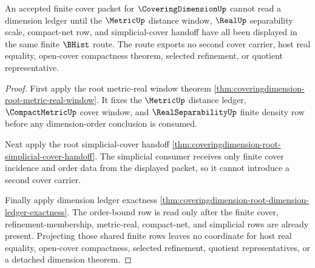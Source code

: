 \begin{theorem}
\label{thm:coveringdimension-root-metric-real-window-separation}
An accepted finite cover packet for $\CoveringDimensionUp$ cannot read a dimension ledger until the $\MetricUp$ distance window, $\RealUp$ separability scale, compact-net row, and simplicial-cover handoff have all been displayed in the same finite $\BHist$ route. The route exports no second cover carrier, host real equality, open-cover compactness theorem, selected refinement, or quotient representative.
\end{theorem}
\begin{proof}
First apply the root metric-real window theorem \autoref{thm:coveringdimension-root-metric-real-window}. It fixes the $\MetricUp$ distance ledger, $\CompactMetricUp$ cover window, and $\RealSeparabilityUp$ finite density row before any dimension-order conclusion is consumed.

Next apply the root simplicial-cover handoff \autoref{thm:coveringdimension-root-simplicial-cover-handoff}. The simplicial consumer receives only finite cover incidence and order data from the displayed packet, so it cannot introduce a second cover carrier.

Finally apply dimension ledger exactness \autoref{thm:coveringdimension-root-dimension-ledger-exactness}. The order-bound row is read only after the finite cover, refinement-membership, metric-real, compact-net, and simplicial rows are already present. Projecting those shared finite rows leaves no coordinate for host real equality, open-cover compactness, selected refinement, quotient representatives, or a detached dimension theorem.
\end{proof}

